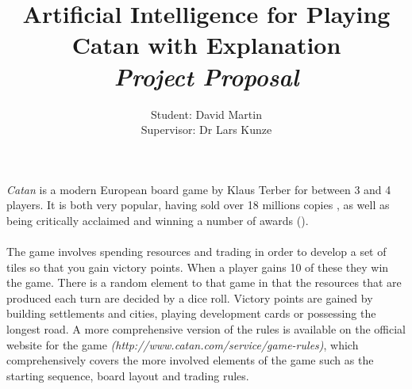\documentclass[]{article}
\title{Artificial Intelligence for Playing Catan with Explanation
\\ \textit{Project Proposal}}
\author{Student: David Martin 
\\ Supervisor: Dr Lars Kunze}
\date{}
\begin{document}
\maketitle

\section*{}
\paragraph{}
\textit{Catan} is a modern European board game by Klaus Terber for between 3 and 4 players. It is both very popular, having sold over 18 millions copies \autocite{raphel2014man}, as well as being critically acclaimed and winning a number of awards (\citeauthor{bgg1}).

\paragraph{}
The game involves spending resources and trading in order to develop a set of tiles so that you gain victory points. When a player gains 10 of these they win the game. There is a random element to that game in that the resources that are produced each turn are decided by a dice roll. Victory points are gained by building settlements and cities, playing development cards or possessing the longest road. A more comprehensive version of the rules is available on the official website for the game \textit{(http://www.catan.com/service/game-rules)}, which comprehensively covers the more involved elements of the game such as the starting sequence, board layout and trading rules. 
\end{document}
